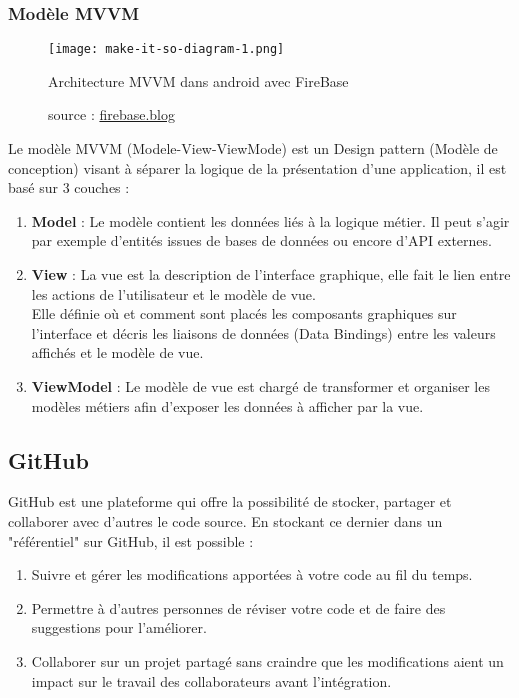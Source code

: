 \subsubsection{Modèle MVVM}

\begin{figure}[h]
    \centering
    \texttt{[image: make-it-so-diagram-1.png]}
    \caption{Architecture MVVM dans android avec FireBase}
    \label{MVVM ARCH }
    \caption*{\small{source : \url{firebase.blog}}}
\end{figure}
Le modèle MVVM (Modele-View-ViewMode) est un Design pattern (Modèle de conception) visant à séparer la logique de la présentation d'une application, il est basé sur 3 couches\cite{arkancesystemsQuestPattern} :
\begin{enumerate}
    \item \textbf{Model} : Le modèle contient les données liés à la logique métier. Il peut s'agir par exemple d'entités issues de bases de données ou encore d'API externes.
    \item \textbf{View} : La vue est la description de l'interface graphique, elle fait le lien entre les actions de l'utilisateur et le modèle de vue.\\ Elle définie où et comment sont placés les composants graphiques sur l'interface et décris les liaisons de données (Data Bindings) entre les valeurs affichés et le modèle de vue.
    \item \textbf{ViewModel} : Le modèle de vue est chargé de transformer et organiser les modèles métiers afin d'exposer les données à afficher par la vue.
\end{enumerate}


\subsection{GitHub}
GitHub est une plateforme qui offre la possibilité de stocker, partager et collaborer avec d'autres le code source. En stockant ce dernier dans un "référentiel" sur GitHub, il est possible :
\begin{enumerate}
    \item Suivre et gérer les modifications apportées à votre code au fil du temps.
    \item Permettre à d'autres personnes de réviser votre code et de faire des suggestions pour l'améliorer.
    \item Collaborer sur un projet partagé sans craindre que les modifications aient un impact sur le travail des collaborateurs avant l'intégration.
\end{enumerate}

